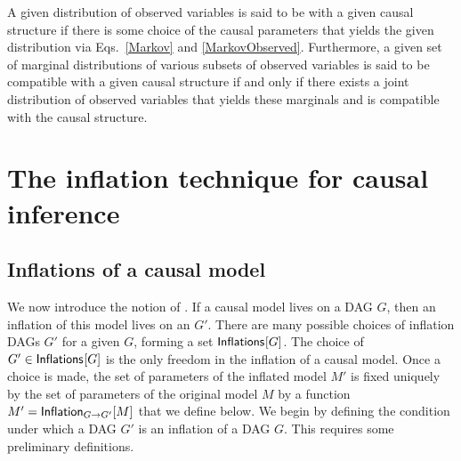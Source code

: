 A given distribution of observed variables is said to be  with a given causal structure if there is some choice of the causal parameters that yields the given distribution via Eqs.~\eqref{Markov} and \eqref{MarkovObserved}. Furthermore, a given set of marginal distributions of various subsets of observed variables is said to be compatible with a given causal structure if and only if there exists a joint distribution of observed variables that yields these marginals and is compatible with the causal structure.


\section{The inflation technique for causal inference}

\subsection{Inflations of a causal model}

We now introduce the notion of .  %
If a causal model lives on a DAG $G$, then an inflation of this model lives on an  $G'$.  
There are many possible choices of inflation DAGs $G'$ for a given $G$, forming a set $\SmallNamedFunction{Inflations}{G}$. The choice of $G'\in \SmallNamedFunction{Inflations}{G}$ is the only freedom in the inflation of a causal model.  Once a choice is made, the set of parameters of the inflated model $M'$ is fixed uniquely by the set of parameters of the original model $M$ by a function $M' = \SmallNamedFunction[G\to G']{Inflation}{M}$ that we define below. We begin by defining the condition under which a DAG $G'$  is an inflation of a DAG $G$.  This requires some preliminary definitions. 

